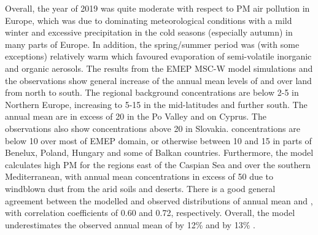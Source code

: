 Overall, the year of 2019 was quite moderate with respect to PM air pollution in Europe, which was due to dominating meteorological conditions with a mild winter and excessive precipitation in the cold seasons (especially autumn) in many parts of Europe. In addition, the spring/summer period was (with some exceptions) relatively warm which favoured evaporation of semi-volatile inorganic and organic aerosols.
The results from the EMEP MSC-W model simulations and the observations show general increase of the annual mean levels of \PM[10] and \PM[2.5] over land from north to south. The regional background concentrations are below 2-5 \ug in Northern Europe, increasing to 5-15 \ug in the mid-latitudes and further south. The annual mean \PM[10] are in excess of 20 \ug in the Po Valley and on Cyprus. The observations also show \PM[10] concentrations above 20 \ug in Slovakia. \PM[2.5] concentrations are below 10 \ug over most of EMEP domain, or otherwise between 10 and 15 \ug in parts of Benelux, Poland, Hungary and some of Balkan countries. Furthermore, the model calculates high PM for the regions east of the Caspian Sea and over the southern Mediterranean, with annual mean concentrations in excess of 50 \ug due to windblown dust from the arid soils and deserts. There is a good general agreement between the modelled and observed distributions of annual mean \PM[10] and \PM[2.5], with correlation coefficients of 0.60 and 0.72, respectively. Overall, the model underestimates the observed annual mean of \PM[10] by 12\% and \PM[2.5] by 13\% .


